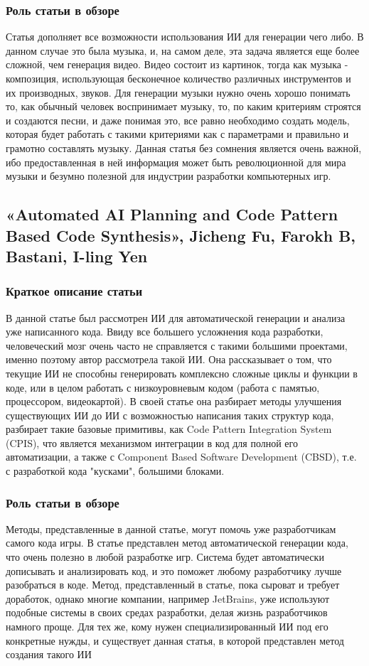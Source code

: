 \documentclass[14pt]{article}
\begin{document}
\subsubsection{Роль статьи в обзоре}
Статья дополняет все возможности использования ИИ для генерации чего либо. В данном случае это была музыка, и, на самом деле, эта задача является еще более сложной, чем генерация видео. Видео состоит из картинок, тогда как музыка - композиция, использующая бесконечное количество различных инструментов и их производных, звуков. Для генерации музыки нужно очень хорошо понимать то, как обычный человек воспринимает музыку, то, по каким критериям строятся и создаются песни, и даже понимая это, все равно необходимо создать модель, которая будет работать с такими критериями как с параметрами и правильно и грамотно составлять музыку. Данная статья без сомнения является очень важной, ибо предоставленная в ней информация может быть революционной для мира музыки и безумно полезной для индустрии разработки компьютерных игр.

\subsection{«Automated AI Planning and Code Pattern Based Code Synthesis», Jicheng Fu, Farokh B, Bastani, I-ling Yen}
\subsubsection{Краткое описание статьи}
В данной статье был рассмотрен ИИ для автоматической генерации и анализа уже написанного кода. Ввиду все большего усложнения кода разработки, человеческий мозг очень часто не справляется с такими большими проектами, именно поэтому автор рассмотрела такой ИИ. Она рассказывает о том, что текущие ИИ не способны генерировать комплексно сложные циклы и функции в коде, или в целом работать с низкоуровневым кодом (работа с памятью, процессором, видеокартой). В своей статье она разбирает методы улучшения существующих ИИ до ИИ с возможностью написания таких структур кода, разбирает такие базовые примитивы, как Code Pattern Integration System (CPIS), что является механизмом интеграции в код для полной его автоматизации, а также с Component Based Software Development (CBSD), т.е. с разработкой кода "кусками", большими блоками.

\subsubsection{Роль статьи в обзоре}
Методы, представленные в данной статье, могут помочь уже разработчикам самого кода игры. В статье представлен метод автоматической генерации кода, что очень полезно в любой разработке игр. Система будет автоматически дописывать и анализировать код, и это поможет любому разработчику лучше разобраться в коде. Метод, представленный в статье, пока сыроват и требует доработок, однако многие компании, например JetBrains, уже используют подобные системы в своих средах разработки, делая жизнь разработчиков намного проще. Для тех же, кому нужен специализированный ИИ под его конкретные нужды, и существует данная статья, в которой представлен метод создания такого ИИ
\end{document}
